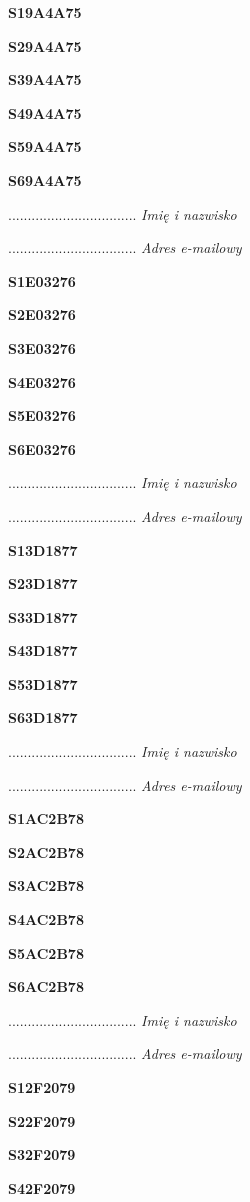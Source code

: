 \Large \textbf{S19A4A75}

\Large \textbf{S29A4A75}

\Large \textbf{S39A4A75}

\Large \textbf{S49A4A75}

\Large \textbf{S59A4A75}

\Large \textbf{S69A4A75}

.................................
\textit{Imię i nazwisko}

.................................
\textit{Adres e-mailowy}

\Large \textbf{S1E03276}

\Large \textbf{S2E03276}

\Large \textbf{S3E03276}

\Large \textbf{S4E03276}

\Large \textbf{S5E03276}

\Large \textbf{S6E03276}

.................................
\textit{Imię i nazwisko}

.................................
\textit{Adres e-mailowy}

\Large \textbf{S13D1877}

\Large \textbf{S23D1877}

\Large \textbf{S33D1877}

\Large \textbf{S43D1877}

\Large \textbf{S53D1877}

\Large \textbf{S63D1877}

.................................
\textit{Imię i nazwisko}

.................................
\textit{Adres e-mailowy}

\Large \textbf{S1AC2B78}

\Large \textbf{S2AC2B78}

\Large \textbf{S3AC2B78}

\Large \textbf{S4AC2B78}

\Large \textbf{S5AC2B78}

\Large \textbf{S6AC2B78}

.................................
\textit{Imię i nazwisko}

.................................
\textit{Adres e-mailowy}

\Large \textbf{S12F2079}

\Large \textbf{S22F2079}

\Large \textbf{S32F2079}

\Large \textbf{S42F2079}

